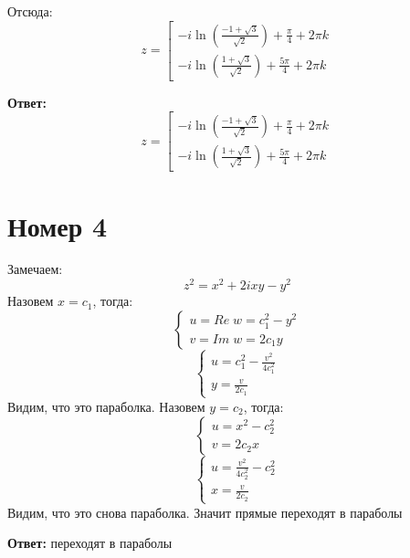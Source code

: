 \documentclass[a4paper,12pt]{article}
\begin{document}
Отсюда:
\[
z = 
\left[ 
      \begin{gathered} 
       -i \ln \left(
	\frac{-1 + \sqrt{3}}{\sqrt{2}} \right) + \frac{\pi}{4} + 2 \pi k \\
	-i \ln \left(
	\frac{1 + \sqrt{3}}{\sqrt{2}} \right) + \frac{5\pi}{4} + 2 \pi k 
      \end{gathered} 
\right.
\]
\begin{center}
\textbf{Ответ: } 
\[
z = 
\left[ 
      \begin{gathered} 
       -i \ln \left(
	\frac{-1 + \sqrt{3}}{\sqrt{2}} \right) + \frac{\pi}{4} + 2 \pi k \\
	-i \ln \left(
	\frac{1 + \sqrt{3}}{\sqrt{2}} \right) + \frac{5\pi}{4} + 2 \pi k 
      \end{gathered} 
\right.
\]
\end{center}
\clearpage
\section*{Номер 4}
Замечаем:
\[
z^2 = x^2 + 2ixy - y^2
\]
Назовем $x = c_1$, тогда:
\[
\begin{cases}
u = Re \;w = c_1^2 - y^2 \\
v = Im\;  w =2 c_1 y
\end{cases}
\]
\[
\begin{cases}
u = c_1^2 - \frac{v^2}{4c_1^2} \\
y = \frac{v}{2c_1}
\end{cases}
\]
Видим, что это параболка.
Назовем $y = c_2$, тогда:
\[
\begin{cases}
u = x^2 - c_2^2 \\
v = 2c_ 2 x
\end{cases}
\]
\[
\begin{cases}
u = \frac{v^2}{4c_2^2} - c_2^2 \\
x = \frac{v}{2c_2}
\end{cases}
\]
Видим, что это снова параболка. Значит прямые переходят в параболы
\begin{center}
\textbf{Ответ: } переходят в параболы
\end{center}
\end{document}
